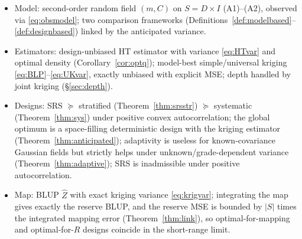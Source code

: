 \documentclass{amsart}
\theoremstyle{definition}
\newcommand{\Zhat}{\widehat Z}
\begin{document}
\begin{itemize}
\item[(a)] Model: second-order random field $(m,C)$ on $S=D\times I$
(A1)--(A2), observed via \eqref{eq:obsmodel}; two comparison frameworks
(Definitions~\ref{def:modelbased}--\ref{def:designbased}) linked by the
anticipated variance.
\item[(b)] Estimators: design-unbiased HT estimator with variance
\eqref{eq:HTvar} and optimal density (Corollary~\ref{cor:optq}); model-best
simple/universal kriging \eqref{eq:BLP}--\eqref{eq:UKvar}, exactly unbiased
with explicit MSE; depth handled by joint kriging (\S\ref{sec:depth}).
\item[(c)] Designs: SRS $\succeq$ stratified (Theorem~\ref{thm:srsstr})
$\succeq$ systematic (Theorem~\ref{thm:sys}) under positive convex
autocorrelation; the global optimum is a space-filling deterministic design
with the kriging estimator (Theorem~\ref{thm:anticipated}); adaptivity is
useless for known-covariance Gaussian fields but strictly helps under
unknown/grade-dependent variance (Theorem~\ref{thm:adaptive}); SRS is
inadmissible under positive autocorrelation.
\item[(d)] Map: BLUP $\Zhat$ with exact kriging variance
\eqref{eq:krigvar}; integrating the map gives exactly the reserve BLUP, and
the reserve MSE is bounded by $|S|$ times the integrated mapping error
(Theorem~\ref{thm:link}), so optimal-for-mapping and optimal-for-$R$
designs coincide in the short-range limit.
\end{itemize}
\end{document}

